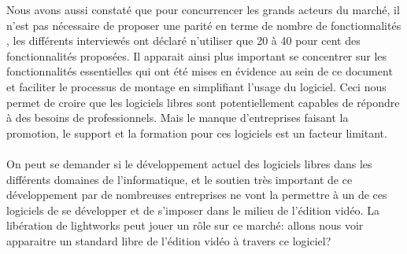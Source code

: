 Nous avons aussi constaté que pour concurrencer les grands acteurs du
marché, il n'est pas nécessaire de proposer une parité en terme de
nombre de fonctionnalités , les différents interviewés ont déclaré
n'utiliser que 20 à 40 pour cent des fonctionnalités proposées. Il
apparait ainsi plus important se concentrer sur les fonctionnalités
essentielles qui ont été mises en évidence au sein de ce document et
faciliter le processus de montage en simplifiant l'usage du logiciel. Ceci
nous permet de croire que les logiciels libres sont potentiellement
capables de répondre à des besoins de professionnels.  Mais le manque
d'entreprises faisant la promotion, le support et la formation pour ces
logiciels est un facteur limitant.

\paragraph{}

On peut se demander si le développement actuel des logiciels libres
dans les différents domaines de l'informatique, et le soutien très
important de ce développement par de nombreuses entreprises ne vont la
permettre à un de ces logiciels de se développer et de s'imposer dans
le milieu de l'édition vidéo.  La libération de lightworks peut jouer
un rôle sur ce marché: allons nous voir apparaitre un standard libre
de l'édition vidéo à travers ce logiciel?
